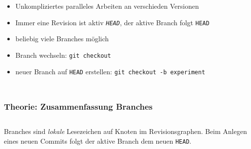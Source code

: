 \documentclass{beamer}
\begin{document}
\begin{frame}[label=branches10]
\begin{columns}
{\begin{tikzpicture}
    \end{tikzpicture}
} %
\begin{itemize}
\item Unkompliziertes paralleles Arbeiten an verschieden Versionen
\item<2-> Immer eine Revision ist aktiv \emph{\texttt{HEAD}}, der aktive Branch folgt \texttt{HEAD}
\item<3-> beliebig viele Branches möglich
\item<4-> Branch wechseln: \texttt{git checkout }
\item<8-> neuer Branch auf \texttt{HEAD} erstellen: \texttt{git checkout -b experiment}
\end{itemize}
\end{columns}
\end{frame}

\begin{frame}
\frametitle{Theorie: Zusammenfassung Branches}
\begin{columns}

  \begin{center}
    \Large Branches sind \emph{lokale} Lesezeichen auf Knoten im
    Revisionsgraphen. Beim Anlegen eines neuen Commits folgt der aktive
    Branch dem neuen \texttt{HEAD}.
  \end{center}
\end{columns}
\end{frame}
\end{document}
